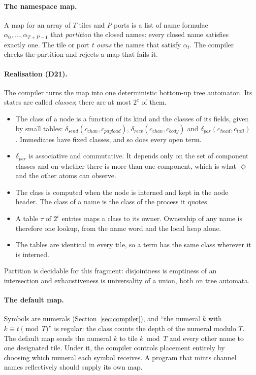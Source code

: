 \documentclass[10.5pt,a4paper]{extarticle}
\newcommand{\dec}[1]{\textbf{D#1}}
\theoremstyle{definition}
\theoremstyle{remark}
\begin{document}
\paragraph{The namespace map.} A map for an array of $T$ tiles and $P$ ports
is a list of name formulae $\alpha_0, \dots, \alpha_{T+P-1}$ that
\emph{partition} the closed names: every closed name satisfies exactly one.
The tile or port $t$ \emph{owns} the names that satisfy $\alpha_t$. The
compiler checks the partition and rejects a map that fails it.

\paragraph{Realisation (\dec{21}).} The compiler turns the map into one
deterministic bottom-up tree automaton. Its states are called
\emph{classes}; there are at most $2^c$ of them.
\begin{itemize}
\item The class of a node is a function of its kind and the classes of its
fields, given by small tables: $\delta_{\mathit{send}}(c_{\mathit{chan}},
c_{\mathit{payload}})$, $\delta_{\mathit{recv}}(c_{\mathit{chan}},
c_{\mathit{body}})$ and $\delta_{\mathit{par}}(c_{\mathit{head}},
c_{\mathit{tail}})$. Immediates have fixed classes, and so does every open
term.
\item $\delta_{\mathit{par}}$ is associative and commutative. It depends only
on the set of component classes and on whether there is more than one
component, which is what $\Diamond$ and the other atoms can observe.
\item The class is computed when the node is interned and kept in the node
header. The class of a name is the class of the process it quotes.
\item A table $\tau$ of $2^c$ entries maps a class to its owner. Ownership of
any name is therefore one lookup, from the name word and the local heap
alone.
\item The tables are identical in every tile, so a term has the same class
wherever it is interned.
\end{itemize}
Partition is decidable for this fragment: disjointness is emptiness of an
intersection and exhaustiveness is universality of a union, both on tree
automata.

\paragraph{The default map.} Symbols are numerals (Section~\ref{sec:compiler}),
and ``the numeral $k$ with $k \equiv t \pmod T$'' is regular: the class
counts the depth of the numeral modulo $T$. The default map sends the numeral
$k$ to tile $k \bmod T$ and every other name to one designated tile. Under
it, the compiler controls placement entirely by choosing which numeral each
symbol receives. A program that mints channel names reflectively should
supply its own map.
\end{document}
